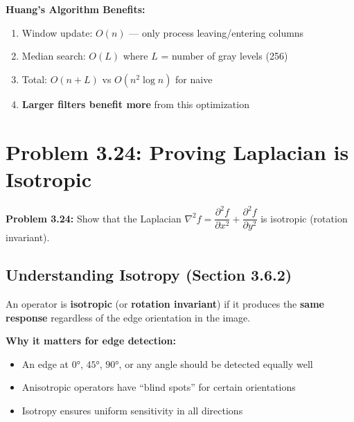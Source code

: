 \documentclass[12pt,a4paper]{article}
\begin{document}
\begin{keypoint}
\textbf{Huang's Algorithm Benefits:}
\begin{enumerate}
    \item Window update: $O(n)$ --- only process leaving/entering columns
    \item Median search: $O(L)$ where $L$ = number of gray levels (256)
    \item Total: $O(n + L)$ vs $O(n^2 \log n)$ for naive
    \item \textbf{Larger filters benefit more} from this optimization
\end{enumerate}
\end{keypoint}

\newpage
\section{Problem 3.24: Proving Laplacian is Isotropic}

\begin{questionbox}
\textbf{Problem 3.24:} Show that the Laplacian $\nabla^2 f = \dfrac{\partial^2 f}{\partial x^2} + \dfrac{\partial^2 f}{\partial y^2}$ is isotropic (rotation invariant).
\end{questionbox}

\subsection{Understanding Isotropy (Section 3.6.2)}

\begin{conceptbox}
An operator is \textbf{isotropic} (or \textbf{rotation invariant}) if it produces the \textbf{same response} regardless of the edge orientation in the image.

\textbf{Why it matters for edge detection:}
\begin{itemize}
    \item An edge at $0°$, $45°$, $90°$, or any angle should be detected equally well
    \item Anisotropic operators have ``blind spots'' for certain orientations
    \item Isotropy ensures uniform sensitivity in all directions
\end{itemize}
\end{conceptbox}
\end{document}
